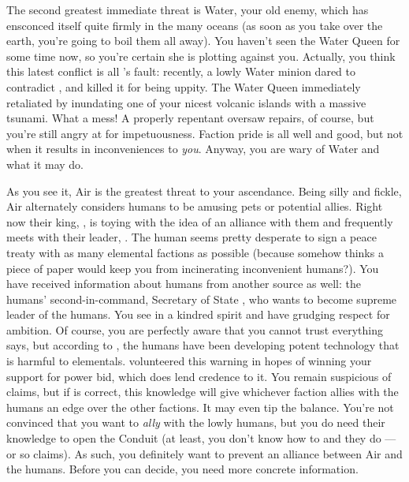 \documentclass[char]{elementals}
\begin{document}
The second greatest immediate threat is Water, your old enemy, which has ensconced itself quite firmly in the many oceans (as soon as you take over the earth, you're going to boil them all away).  You haven't seen the Water Queen for some time now, so you're certain she is plotting against you.  Actually, you think this latest conflict is all \cPyro{}'s fault: recently, a lowly Water minion dared to contradict \cPyro{\them}, and \cPyro{} killed it for being uppity.  The Water Queen immediately retaliated by inundating one of your nicest volcanic islands with a massive tsunami.  What a mess!  A properly repentant \cPyro{} oversaw repairs, of course, but you're still angry at \cPyro{\them} for \cPyro{\their} impetuousness.  Faction pride is all well and good, but not when it results in inconveniences to \emph{you}.  Anyway, you are wary of Water and what it may do.

As you see it, Air is the greatest threat to your ascendance.  Being silly and fickle, Air alternately considers humans to be amusing pets or potential allies.  Right now their king, \cKing{\intro}, is toying with the idea of an alliance with them and frequently meets with their leader, \cLeader{\intro}.  The human seems pretty desperate to sign a peace treaty with as many elemental factions as possible (because somehow \cLeader{\they} thinks a piece of paper would keep you from incinerating inconvenient humans?).  You have received information about humans from another source as well: the humans' second-in-command, Secretary of State \cDema{\intro}, who wants to become supreme leader of the humans.  You see in \cDema{\them} a kindred spirit and have grudging respect for \cDema{\their} ambition.  Of course, you are perfectly aware that you cannot trust everything \cDema{\they} says, but according to \cDema{\them}, the humans have been developing potent technology that is harmful to elementals.  \cDema{\They} volunteered this warning in hopes of winning your support for \cDema{\their} power bid, which does lend credence to it.  You remain suspicious of \cDema{\their} claims, but if \cDema{\they} is correct, this knowledge will give whichever faction allies with the humans an edge over the other factions.  It may even tip the balance.  You're not convinced that you want to \emph{ally} with the lowly humans, but you do need their knowledge to open the Conduit (at least, you don't know how to and they do --- or so \cDema{} claims).  As such, you definitely want to prevent an alliance between Air and the humans.  Before you can decide, you need more concrete information.
\end{document}
